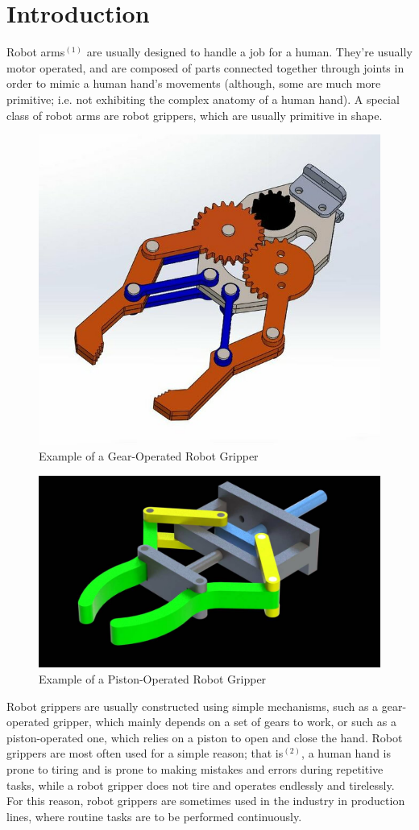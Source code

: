 \documentclass{article}
\begin{document}
\section*{Introduction}
Robot arms$^{(1)}$ are usually designed to handle a job for a human. They're usually motor operated,
and are composed of parts connected together through joints in order to mimic a human hand's movements
(although, some are much more primitive; i.e. not exhibiting the complex anatomy of a human hand).
\newline \newline
A special class of robot arms are robot grippers, which are usually primitive in shape.
\begin{figure}[h]
    \centering
    \includegraphics[width=0.5\linewidth]{Images/gear-operated_robot_gripper.jpg}
    \caption{Example of a Gear-Operated Robot Gripper}
    \label{fig:f1}
\end{figure}
\begin{figure}[h]
    \centering
    \includegraphics[width=0.5\linewidth]{Images/piston-operated_robot_gripper.jpg}
    \caption{Example of a Piston-Operated Robot Gripper}
    \label{fig:f2}
\end{figure}
\newline
Robot grippers are usually constructed using simple mechanisms, such as a gear-operated gripper,
which mainly depends on a set of gears to work, or such as a piston-operated one, which relies
on a piston to open and close the hand.
\newline \newline
Robot grippers are most often used for a simple reason; that is$^{(2)}$, a human hand is prone to tiring
and is prone to making mistakes and errors during repetitive tasks, while a robot gripper does 
not tire and operates endlessly and tirelessly. For this reason, robot grippers are sometimes used
in the industry in production lines, where routine tasks are to be performed continuously.
\end{document}
